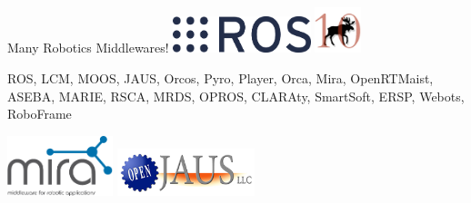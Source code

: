 \documentclass[aspectratio=43]{beamer}
\begin{document}
\begin{frame}{Many Robotics Middlewares!}
 \centering 
          \includegraphics[width=0.3\textwidth]{fig/logo-ros.pdf}  \hspace{2cm}
\centering 
          \includegraphics[width=0.1\textwidth]{fig/logo-MOOS.jpg}

\vspace

ROS, LCM, MOOS, JAUS, Orcos, Pyro, Player, Orca, Mira, OpenRTMaist, ASEBA, MARIE, RSCA, MRDS, OPROS, CLARAty, SmartSoft, ERSP, Webots, RoboFrame

\vspace

\centering 
          \includegraphics[width=0.23\textwidth]{fig/logo-mira.png} \hspace{1.5cm}
\centering 
          \includegraphics[width=0.3\textwidth]{fig/logo-openjaus.png}   
\end{frame}
 
\end{document}
